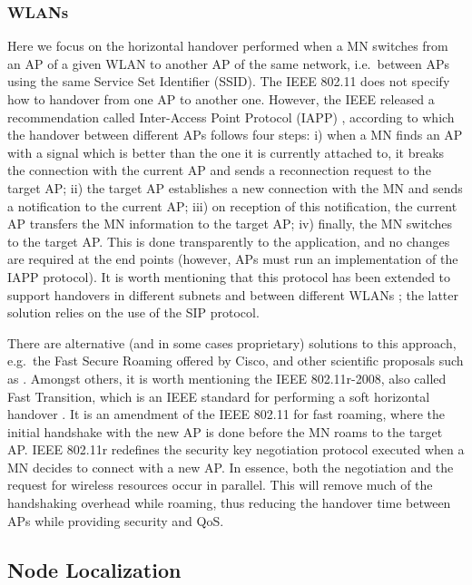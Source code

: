 \documentclass[preprint,12pt]{elsarticle}
\begin{document}
\subsubsection{WLANs}
Here we focus on the horizontal handover performed when a MN switches from an 
AP of a given WLAN to another AP of the same network, i.e.~between APs using 
the same Service Set Identifier (SSID).
The IEEE 802.11 does not specify how to handover from one AP to another one. 
However, the IEEE released a recommendation called Inter-Access Point Protocol 
(IAPP) \cite{802f02}, according to which the handover between different APs follows four steps: i)
when a MN finds an AP with a signal which is better than the one it is 
currently attached to, it breaks the connection with the current AP and sends 
a reconnection request to the target AP; 
ii) the target AP establishes a new connection with the MN and sends a 
notification to the current AP; iii) on reception of this notification, the 
current AP transfers the MN information to the target AP; iv) finally, the MN 
switches to the target AP.
This is done transparently to the application, and no changes 
are required at the end points (however, APs must run an implementation of the 
IAPP protocol).
It is worth mentioning that this protocol 
has been extended to support handovers in different subnets \cite{TMC.2005.49} 
and between different WLANs \cite{WuYH07}; the latter solution relies on the use of the \ac{SIP} protocol.

There are alternative (and in some cases proprietary) solutions to this 
approach, e.g.~the Fast Secure Roaming offered by Cisco, and other scientific 
proposals such as \cite{ghini_wdays10,pack,ramani}.
Amongst others, it is worth mentioning the IEEE 802.11r-2008, also called 
Fast Transition, which is an IEEE standard for performing a soft horizontal 
handover \cite{802.11r}. It is an amendment of 
the IEEE 802.11 for fast roaming, where the initial handshake with the new AP 
is done before the MN roams to the target AP. IEEE 802.11r redefines the 
security key negotiation protocol executed when a MN decides to connect with 
a new AP. In essence, both the negotiation and the request for wireless 
resources occur in parallel. This will remove much of the handshaking overhead 
while roaming, thus reducing the handover time between APs while providing 
security and QoS.


\subsection{Node Localization}
\end{document}
